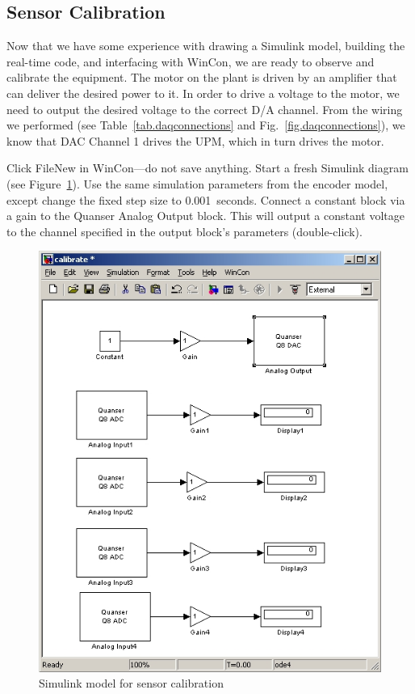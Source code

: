 \subsection{Sensor Calibration}
Now that we have some experience with drawing a Simulink model, building the real-time code, and interfacing with WinCon, we are ready to observe and calibrate the equipment.  The motor on the plant is driven by an amplifier that can deliver the desired power to it.  In order to drive a voltage to the motor, we need to output the desired voltage to the correct D/A channel.  From the wiring we performed (see Table~\ref{tab.daqconnections} and Fig.\ \ref{fig.daqconnections}), we know that DAC Channel 1 drives the UPM, which in turn drives the motor.
\par
Click File\textrightarrow New in WinCon---do not save anything.  Start a fresh Simulink diagram (see Figure~\ref{fig.calibratemodel}).  Use the same simulation parameters from the encoder model, except change the fixed step size to 0.001~seconds.  Connect a constant block via a gain to the Quanser Analog Output block.  This will output a constant voltage to the channel specified in the output block's parameters (double-click).
\par

\begin{figure}[bht]
\centering
\includegraphics[width=.6\textwidth]{calibratemodel}
\caption{\footnotesize
        Simulink model for sensor calibration
        \label{fig.calibratemodel}
        }
\end{figure}

